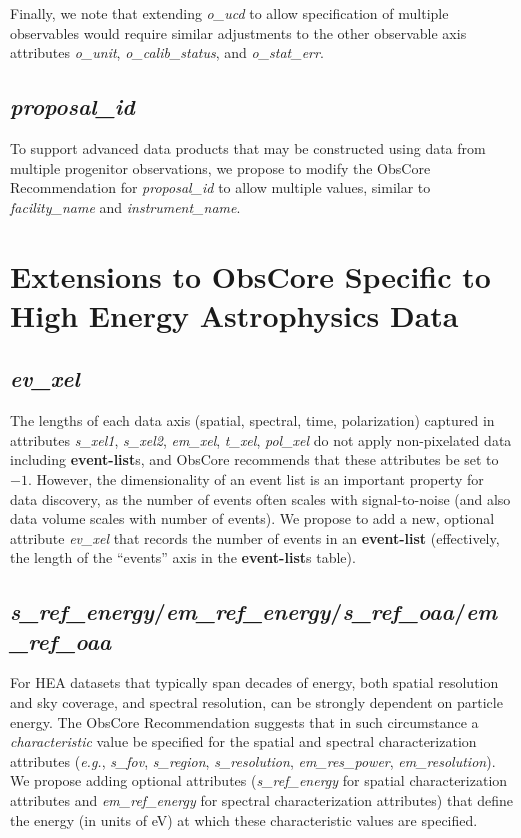 \documentclass[11pt,a4paper]{ivoa}
\begin{document}
Finally, we note that extending {\em o\_ucd\/} to allow specification of multiple observables would require similar adjustments to the other observable axis attributes {\em o\_unit}, {\em o\_calib\_status}, and {\em o\_stat\_err}.


\subsection{{\em proposal\_id}}

To support advanced data products that may be constructed using data from multiple progenitor observations, we propose to modify the ObsCore Recommendation for {\em proposal\_id\/} to allow multiple values, similar to {\em facility\_name\/} and {\em instrument\_name}.


\section{Extensions to ObsCore Specific to High Energy Astrophysics Data}
\label{sec:obscoreext}

\subsection{{\em ev\_xel}}

The lengths of each data axis (spatial, spectral, time, polarization) captured in attributes {\em s\_xel1\/}, {\em s\_xel2\/}, {\em em\_xel\/}, {\em t\_xel\/}, {\em pol\_xel\/} do not apply non-pixelated data including {\bf event-list}s, and ObsCore recommends that these attributes be set to $-1$.  However, the dimensionality of an event list is an important property for data discovery, as the number of events often scales with signal-to-noise (and also data volume scales with number of events).  We propose to add a new, optional attribute {\em ev\_xel\/} that records the number of events in an {\bf event-list} (effectively, the length of the ``events'' axis in the {\bf event-list}s table).

\subsection{{\em s\_ref\_energy\/}/{\em em\_ref\_energy\/}/{\em s\_ref\_oaa\/}/{\em em\_ref\_oaa}}

For HEA datasets that typically span decades of energy, both spatial resolution and sky coverage, and spectral resolution, can be strongly dependent on particle energy.  The ObsCore Recommendation suggests that in such circumstance a {\em characteristic\/} value be specified for the spatial and spectral characterization attributes ({\em e.g.\/}, {\em s\_fov\/}, {\em s\_region\/}, {\em s\_resolution\/}, {\em em\_res\_power\/}, {\em em\_resolution\/}).  We propose adding optional attributes ({\em s\_ref\_energy\/} for spatial characterization attributes and {\em em\_ref\_energy\/} for spectral characterization attributes) that define the energy (in units of eV) at which these characteristic values are specified.
\end{document}
